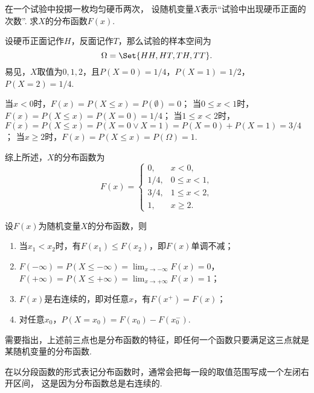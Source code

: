 \begin{example}
在一个试验中投掷一枚均匀硬币两次，
设随机变量\(X\)表示“试验中出现硬币正面的次数”.
求\(X\)的分布函数\(F(x)\).
\begin{solution}
设硬币正面记作\(H\)，反面记作\(T\)，那么试验的样本空间为\begin{equation*}
	\Omega = \Set{ HH, HT, TH, TT }.
\end{equation*}
易见，\(X\)取值为\(0,1,2\)，且\(P(X=0) = 1/4\)，\(P(X=1) = 1/2\)，\(P(X=2) = 1/4\).

当\(x < 0\)时，\(F(x) = P(X \leq x) = P(\emptyset) = 0\)；
当\(0 \leq x < 1\)时，\(F(x) = P(X \leq x) = P(X=0) = 1/4\)；
当\(1 \leq x < 2\)时，\(F(x) = P(X \leq x) = P(X=0 \lor X=1) = P(X=0)+P(X=1) = 3/4\)；
当\(x \geq 2\)时，\(F(x) = P(X \leq x) = P(\Omega) = 1\).

综上所述，\(X\)的分布函数为\begin{equation*}
	F(x) = \left\{ \begin{array}{cl}
		0, & x < 0, \\
		1/4, & 0 \leq x < 1, \\
		3/4, & 1 \leq x < 2, \\
		1, & x \geq 2.
	\end{array} \right.
\end{equation*}
\end{solution}
\end{example}

\begin{property}
设\(F(x)\)为随机变量\(X\)的分布函数，则
\begin{enumerate}
	\item 当\(x_1 < x_2\)时，有\(F(x_1) \leq F(x_2)\)，即\(F(x)\)单调不减；
	\item \(F(-\infty)=P(X \leq -\infty) = \lim_{x \to -\infty}{F(x)} = 0\)，
	\(F(+\infty)=P(X \leq +\infty) = \lim_{x \to +\infty}{F(x)} = 1\)；
	\item \(F(x)\)是右连续的，即对任意\(x\)，有\(F(x^+)=F(x)\)；
	\item 对任意\(x_0\)，\(P(X=x_0)=F(x_0)-F(x_0^-)\).
\end{enumerate}
\end{property}
需要指出，上述前三点也是分布函数的特征，即任何一个函数只要满足这三点就是某随机变量的分布函数.

在以分段函数的形式表记分布函数时，通常会把每一段的取值范围写成一个左闭右开区间，
这是因为分布函数总是右连续的.
